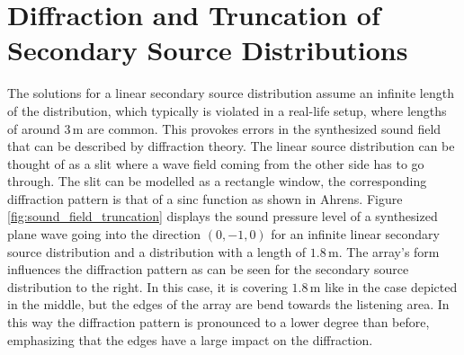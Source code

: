 \section[Diffraction and Truncation]{Diffraction and Truncation of Secondary Source Distributions}
\label{sec:diffraction_and_truncation_of_secondary_source_distributions}
%
\begin{figure*}
    \small
    
    \caption{Sound pressure in decibel of a plane wave synthesized with
    \twohalfD \ac{WFS}~\protect\eqref{eq:D_wfs_pw_25D}.
    The result of an infinite linear secondary source distribution is
    compared with two truncated ones. Parameters: $\n_k = (0,-1,0)$, $\xref =
    (0,-2,0)$\,m $f = 3$\,kHz.
    }
    \label{fig:sound_field_truncation}
\end{figure*}
%
\noindent The solutions for a linear secondary source distribution assume an infinite
length of the distribution, which typically is violated in a real-life
setup, where lengths of around $3$\,m are common. This provok\-es errors in the
synthesized sound field that can be described by diffraction theory. The
linear source distribution can be thought of as a slit where a wave field
coming from the other side has to go through. The slit can be modelled as
a rectangle window, the corresponding diffraction pattern is that of a sinc
function as shown in Ahrens.\autocite[][(3.87)]{Ahrens2012}
Figure\,\ref{fig:sound_field_truncation} displays the sound pressure level
of a synthesized plane wave
going into the direction $(0,-1,0)$ for an infinite linear secondary source
distribution and a distribution with a length of $1.8$\,m. The array's form
influences the diffraction pattern as can be seen for the
secondary source distribution to the right. In this case, it is covering
$1.8$\,m like in the case depicted in the middle,
but the edges of the array are bend towards the listening area. In this way the diffraction
pattern is pronounced to a lower degree than before, emphasizing that the edges
have a large impact on the diffraction.


